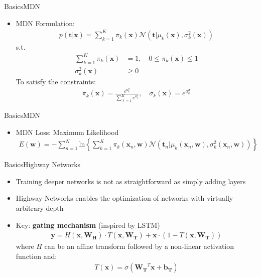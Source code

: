 \documentclass{beamer}
\begin{document}
	\begin{frame}{Basics}{MDN}
	\begin{itemize}
	\item {MDN Formulation:}
	\begin{align*}
	p(\boldsymbol{t}|\boldsymbol{x}) = \sum_{k=1}^{K}\pi_k(\boldsymbol{x})\mathcal{N}(\boldsymbol{t}|\mu_k(\boldsymbol{x}), \sigma^2_k(\boldsymbol{x}))
	\end{align*}
	s.t.
	\begin{align*}
	\sum_{k=1}^{K}\pi_k(\boldsymbol{x})&=1, \quad 0 \leq \pi_k(\boldsymbol{x}) \leq 1 \\
	\sigma_k^2(\boldsymbol{x}) &\geq 0
	\end{align*}
	To satisfy the constraints:
	\begin{align*}
	\pi_k(\boldsymbol{x})=\frac{e^{a_k^\pi}}{\sum_{\ell=1}^{K}e^{a_\ell^\pi}}, \quad \sigma_k(\boldsymbol{x})=e^{a_k^\sigma}
	\end{align*}
	\end{itemize}
	\end{frame}
       
	\begin{frame}{Basics}{MDN}
	\begin{itemize}
	\item {MDN Loss: {\color{magenta} Maximum Likelihood}}
	\begin{align*}
	E(\boldsymbol{w}) = -\sum_{n=1}^{N}\text{ln}\left\lbrace\sum_{k=1}^{K}\pi_k(\boldsymbol{x}_n, \boldsymbol{w})\mathcal{N}(\boldsymbol{t}_n|\mu_k(\boldsymbol{x}_n, \boldsymbol{w}), \sigma^2_k(\boldsymbol{x}_n, \boldsymbol{w}))\right\rbrace
	\end{align*}
	
	\end{itemize}
	\end{frame}
	
	
	\begin{frame}{Basics}{Highway Networks}
	\begin{itemize}
	\item {Training deeper networks is not as straightforward as simply adding layers}
	\item {{\color{magenta}Highway Networks} enables the optimization of networks with {\color{blue} virtually arbitrary depth}}
	\item {{\color{magenta}Key}: \textbf{gating mechanism} (inspired by LSTM)}
	\begin{align*}
	\boldsymbol{y}=H(\boldsymbol{x}, \boldsymbol{W_H})\cdot T(\boldsymbol{x}, \boldsymbol{W_T}) + \boldsymbol{x}\cdot (1-T(\boldsymbol{x}, \boldsymbol{W_T}))
	\end{align*}
	where $H$ can be an affine transform followed by a non-linear activation function  and:
	\begin{align*}
	T(\boldsymbol{x}) = \sigma(\boldsymbol{W_T}^T\boldsymbol{x}+\boldsymbol{b_T})
	\end{align*}
	\end{itemize}
	\end{frame}
	
\end{document}
